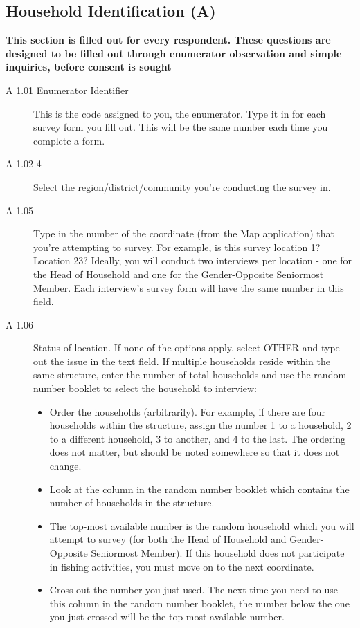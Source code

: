 \documentclass[a4paper]{refart}
\begin{document}
\subsection{Household Identification (A)}
\textbf{This section is filled out for every respondent. These questions are designed to be filled out through enumerator observation and simple inquiries, before consent is sought}


\begin{description}
\item[A 1.01 Enumerator Identifier] This is the code assigned to you, the enumerator. Type it in for each survey form you fill out. This will be the same number each time you complete a form.

\item[A 1.02-4] Select the region/district/community you're conducting the survey in.

\item[A 1.05] Type in the number of the coordinate (from the Map application) that you're attempting to survey. For example, is this survey location 1? Location 23? Ideally, you will conduct two interviews per location - one for the Head of Household and one for the Gender-Opposite Seniormost Member. Each interview's survey form will have the same number in this field.

\item[A 1.06] Status of location. If none of the options apply, select OTHER and type out the issue in the text field. If multiple households reside within the same structure, enter the number of total households and use the random number booklet to select the household to interview:
\begin{itemize}
\item Order the households (arbitrarily). For example, if there are four households within the structure, assign the number 1 to a household, 2 to a different household, 3 to another, and 4 to the last. The ordering does not matter, but should be noted somewhere so that it does not change.
\item Look at the column in the random number booklet which contains the number of households in the structure.
\item The top-most available number is the random household which you will attempt to survey (for both the Head of Household and Gender-Opposite Seniormost Member). If this household does not participate in fishing activities, you must move on to the next coordinate.
\item Cross out the number you just used. The next time you need to use this column in the random number booklet, the number below the one you just crossed will be the top-most available number.
\end{itemize}


\end{description}
\end{document}
